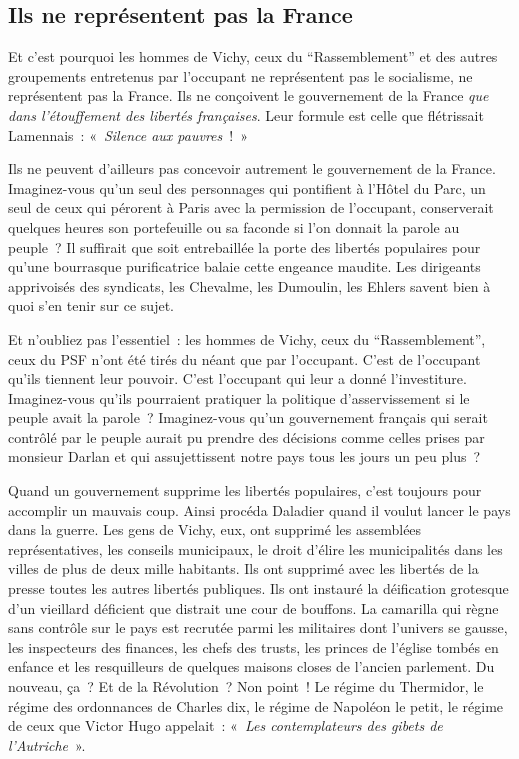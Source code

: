 \documentclass[french,twoside]{book} %
\begin{document}
\subsection[Ils ne représentent pas la France]{Ils ne représentent pas la France}
\noindent Et c’est pourquoi les hommes de Vichy, ceux du “Rassemblement” et des autres groupements entretenus par l’occupant ne représentent pas le socialisme, ne représentent pas la France. Ils ne conçoivent le gouvernement de la France \emph{que dans l’étouffement des libertés françaises}. Leur formule est celle que flétrissait Lamennais : « \emph{Silence aux pauvres} ! »\par
Ils ne peuvent d’ailleurs pas concevoir autrement le gouvernement de la France. Imaginez-vous qu’un seul des personnages qui pontifient à l’Hôtel du Parc, un seul de ceux qui pérorent à Paris avec la permission de l’occupant, conserverait quelques heures son portefeuille ou sa faconde si l’on donnait la parole au peuple ? Il suffirait que soit entrebaillée la porte des libertés populaires pour qu’une bourrasque purificatrice balaie cette engeance maudite. Les dirigeants apprivoisés des syndicats, les Chevalme, les Dumoulin, les Ehlers savent bien à quoi s’en tenir sur ce sujet.\par
Et n’oubliez pas l’essentiel : les hommes de Vichy, ceux du “Rassemblement”, ceux du PSF n’ont été tirés du néant que par l’occupant. C’est de l’occupant qu’ils tiennent leur pouvoir. C’est l’occupant qui leur a donné l’investiture. Imaginez-vous qu’ils pourraient pratiquer la politique d’asservissement si le peuple avait la parole ? Imaginez-vous qu’un gouvernement français qui serait contrôlé par le peuple aurait pu prendre des décisions comme celles prises par monsieur Darlan et qui assujettissent notre pays tous les jours un peu plus ?\par
Quand un gouvernement supprime les libertés populaires, c’est toujours pour accomplir un mauvais coup. Ainsi procéda Daladier quand il voulut lancer le pays dans la guerre. Les gens de Vichy, eux, ont supprimé les assemblées représentatives, les conseils municipaux, le droit d’élire les municipalités dans les villes de plus de deux mille habitants. Ils ont supprimé avec les libertés de la presse toutes les autres libertés publiques. Ils ont instauré la déification grotesque d’un vieillard déficient que distrait une cour de bouffons. La camarilla qui règne sans contrôle sur le pays est recrutée parmi les militaires dont l’univers se gausse, les inspecteurs des finances, les chefs des trusts, les princes de l’église tombés en enfance et les resquilleurs de quelques maisons closes de l’ancien parlement. Du nouveau, ça ? Et de la Révolution ? Non point ! Le régime du Thermidor, le régime des ordonnances de Charles dix, le régime de Napoléon le petit, le régime de ceux que Victor Hugo appelait : « \emph{Les contemplateurs des gibets de l’Autriche} ».
\end{document}

